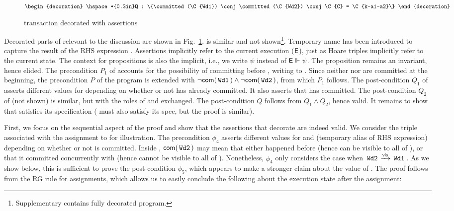 \begin{figure}
\begin{txnimpcode}
$\begin{decoration}
  \hspace*{0.3in}Q : \{\committed(\C{Wd1}) \conj \committed(\C{Wd2}) \conj
                          \C{C} = \C{k-a1-a2}\}
\end{decoration}$
\end{txnimpcode}

\caption{ transaction decorated with assertions}
\label{fig:wd1-decorated}
\end{figure}

Decorated parts of  relevant to the discussion are shown in
Fig.~\ref{fig:wd1-decorated}.   is similar and not
shown\footnote{Supplementary contains fully decorated program.}.
Temporary name  has been introduced to capture the result of the
RHS expression .  Assertions implicitly refer to the current
execution ($\textsf{E}$), just as Hoare triples implicitly refer to the
current state.  The context for propositions is also the implicit,
i.e., we write $\psi$ instead of $\textsf{E} \Vdash \psi$. The proposition  remains an invariant, hence elided. The precondition
$P_1$ of  accounts for the possibility of  committing
before , writing  to . Since neither  nor
 are committed at the beginning, the precondition $P$ of the
program is extended with $\neg\textsf{com}(\,{\tt Wd1}\,) \wedge
\neg\textsf{com}(\,{\tt Wd2}\,)$, from which $P_1$ follows. The post-condition
$Q_1$ of  asserts different values for  depending on
whether or not  has already committed.  It also asserts that
 has committed. The post-condition $Q_2$ of  (not shown)
is similar, but with the roles of  and  exchanged. The
post-condition $Q$ follows from $Q_1 \wedge Q_2$, hence valid. It
remains to show that  satisfies its specification ( must
also satisfy its spec, but the proof is similar).

First, we focus on the sequential aspect of the proof and show that
the assertions that decorate  are indeed valid. We consider the
triple associated with the assignment to  for illustration. The
precondition $\phi_4$ asserts different values for  and 
(temporary alias of RHS expression) depending on whether or not
 is committed. Inside , $\textsf{com}(\,{\tt Wd2}\,)$ may mean
that either  happened before  (hence can be visible to
all of ), or that it committed concurrently with  (hence
cannot be visible to all of ).  Nonetheless, $\phi_4$ only
considers the case when $\,{\tt Wd2}\, \xrightarrow{\textsf{vis}} \,{\tt Wd1}\,$. As we show below,
this is sufficient to prove the post-condition $\phi_5$, which appears
to make a stronger claim about the value of . The proof follows
from the RG rule  for assignments, which allows us
to easily conclude the following about the execution state after the
assignment:

